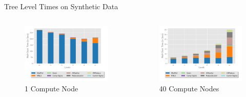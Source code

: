 \documentclass{beamer}
\begin{document}
\begin{frame}{Tree Level Times on Synthetic Data}
    \centering
    \begin{columns}
        \begin{column}{0.5\textwidth}
            \begin{figure}
            \includegraphics[width=\textwidth]{../plots/synthetic_sequential_level_breakdown.pdf}
            \caption{1 Compute Node}
            \end{figure}
        \end{column}
        \begin{column}{0.5\textwidth}
            \begin{figure}
            \includegraphics[width=\textwidth]{../plots/synthetic_parallel_level_breakdown.pdf}
            \caption{40 Compute Nodes}
            \end{figure}
        \end{column}
    \end{columns}
\end{frame}
\end{document}
